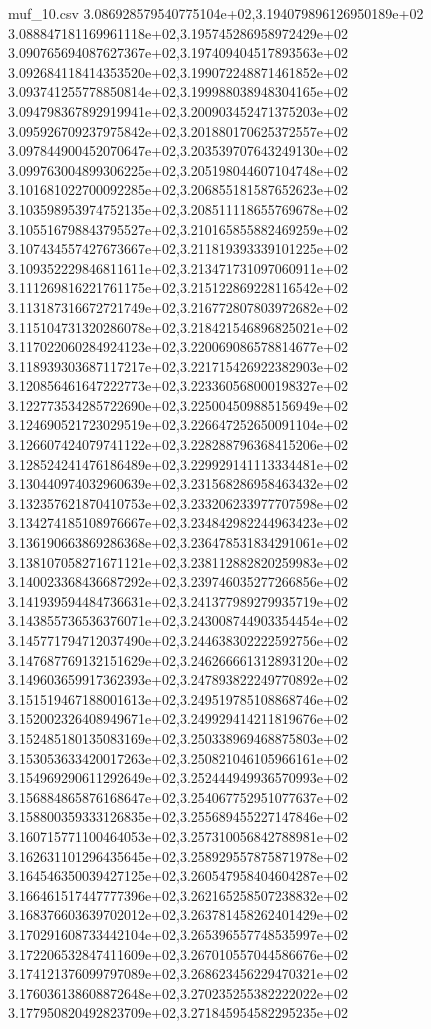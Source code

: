 \begin{filecontents*}{muf_10.csv}
3.086928579540775104e+02,3.194079896126950189e+02
3.088847181169961118e+02,3.195745286958972429e+02
3.090765694087627367e+02,3.197409404517893563e+02
3.092684118414353520e+02,3.199072248871461852e+02
3.093741255778850814e+02,3.199988038948304165e+02
3.094798367892919941e+02,3.200903452471375203e+02
3.095926709237975842e+02,3.201880170625372557e+02
3.097844900452070647e+02,3.203539707643249130e+02
3.099763004899306225e+02,3.205198044607104748e+02
3.101681022700092285e+02,3.206855181587652623e+02
3.103598953974752135e+02,3.208511118655769678e+02
3.105516798843795527e+02,3.210165855882469259e+02
3.107434557427673667e+02,3.211819393339101225e+02
3.109352229846811611e+02,3.213471731097060911e+02
3.111269816221761175e+02,3.215122869228116542e+02
3.113187316672721749e+02,3.216772807803972682e+02
3.115104731320286078e+02,3.218421546896825021e+02
3.117022060284924123e+02,3.220069086578814677e+02
3.118939303687117217e+02,3.221715426922382903e+02
3.120856461647222773e+02,3.223360568000198327e+02
3.122773534285722690e+02,3.225004509885156949e+02
3.124690521723029519e+02,3.226647252650091104e+02
3.126607424079741122e+02,3.228288796368415206e+02
3.128524241476186489e+02,3.229929141113334481e+02
3.130440974032960639e+02,3.231568286958463432e+02
3.132357621870410753e+02,3.233206233977707598e+02
3.134274185108976667e+02,3.234842982244963423e+02
3.136190663869286368e+02,3.236478531834291061e+02
3.138107058271671121e+02,3.238112882820259983e+02
3.140023368436687292e+02,3.239746035277266856e+02
3.141939594484736631e+02,3.241377989279935719e+02
3.143855736536376071e+02,3.243008744903354454e+02
3.145771794712037490e+02,3.244638302222592756e+02
3.147687769132151629e+02,3.246266661312893120e+02
3.149603659917362393e+02,3.247893822249770892e+02
3.151519467188001613e+02,3.249519785108868746e+02
3.152002326408949671e+02,3.249929414211819676e+02
3.152485180135083169e+02,3.250338969468875803e+02
3.153053633420017263e+02,3.250821046105966161e+02
3.154969290611292649e+02,3.252444949936570993e+02
3.156884865876168647e+02,3.254067752951077637e+02
3.158800359333126835e+02,3.255689455227147846e+02
3.160715771100464053e+02,3.257310056842788981e+02
3.162631101296435645e+02,3.258929557875871978e+02
3.164546350039427125e+02,3.260547958404604287e+02
3.166461517447777396e+02,3.262165258507238832e+02
3.168376603639702012e+02,3.263781458262401429e+02
3.170291608733442104e+02,3.265396557748535997e+02
3.172206532847411609e+02,3.267010557044586676e+02
3.174121376099797089e+02,3.268623456229470321e+02
3.176036138608872648e+02,3.270235255382222022e+02
3.177950820492823709e+02,3.271845954582295235e+02

\end{filecontents*}
